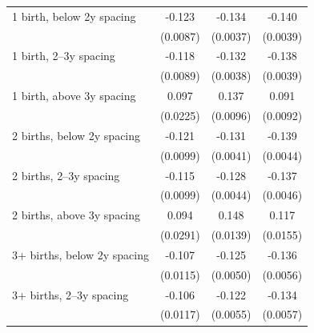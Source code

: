 {\begin{tabular}{l*{3}{c}}
\addlinespace
\hspace*{1em}1 birth, below 2y spacing&      -0.123\sym{***}&      -0.134\sym{***}&      -0.140\sym{***}\\
                    &    (0.0087)         &    (0.0037)         &    (0.0039)         \\
\addlinespace
\hspace*{1em}1 birth, 2--3y spacing&      -0.118\sym{***}&      -0.132\sym{***}&      -0.138\sym{***}\\
                    &    (0.0089)         &    (0.0038)         &    (0.0039)         \\
\addlinespace
\hspace*{1em}1 birth, above 3y spacing&       0.097\sym{***}&       0.137\sym{***}&       0.091\sym{***}\\
                    &    (0.0225)         &    (0.0096)         &    (0.0092)         \\
\addlinespace
\hspace*{1em}2 births, below 2y spacing&      -0.121\sym{***}&      -0.131\sym{***}&      -0.139\sym{***}\\
                    &    (0.0099)         &    (0.0041)         &    (0.0044)         \\
\addlinespace
\hspace*{1em}2 births, 2--3y spacing&      -0.115\sym{***}&      -0.128\sym{***}&      -0.137\sym{***}\\
                    &    (0.0099)         &    (0.0044)         &    (0.0046)         \\
\addlinespace
\hspace*{1em}2 births, above 3y spacing&       0.094\sym{**} &       0.148\sym{***}&       0.117\sym{***}\\
                    &    (0.0291)         &    (0.0139)         &    (0.0155)         \\
\addlinespace
\hspace*{1em}3+ births, below 2y spacing&      -0.107\sym{***}&      -0.125\sym{***}&      -0.136\sym{***}\\
                    &    (0.0115)         &    (0.0050)         &    (0.0056)         \\
\addlinespace
\hspace*{1em}3+ births, 2--3y spacing&      -0.106\sym{***}&      -0.122\sym{***}&      -0.134\sym{***}\\
                    &    (0.0117)         &    (0.0055)         &    (0.0057)         \\

\end{tabular}}
